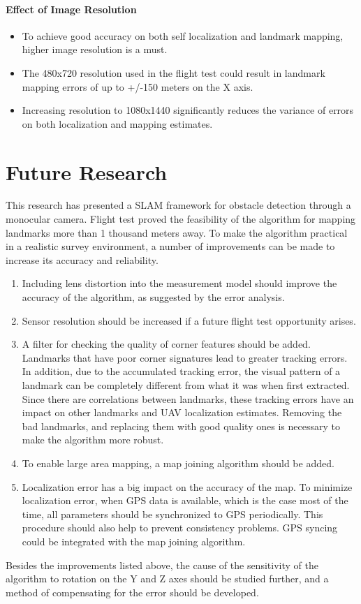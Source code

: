 \paragraph{Effect of Image Resolution}
\begin{itemize}
  \item To achieve good accuracy on both self localization and landmark
  mapping, higher image resolution is a must.
  \item The 480x720 resolution used in the flight test could result in
  landmark mapping errors of up to +/-150 meters on the X axis.
  \item Increasing resolution to 1080x1440 significantly reduces the
  variance of errors on both localization and mapping estimates.
\end{itemize}

\section{Future Research}
This research has presented a SLAM framework for obstacle detection
through a monocular camera. Flight test proved the feasibility of the
algorithm for mapping landmarks more than 1 thousand meters away.
To make the algorithm practical in a realistic survey environment, a number
of improvements can be made to increase its accuracy and reliability.
\begin{enumerate}
  \item Including lens distortion into the measurement model should
  improve the accuracy of the algorithm, as suggested by the error
  analysis.
  \item Sensor resolution should be increased if a future flight
  test opportunity arises.
  \item A filter for checking the quality of corner features should be
  added. Landmarks that have poor corner signatures lead to greater
  tracking errors. In addition, due to the accumulated tracking error,
  the visual pattern of a landmark can be completely different from
  what it was when first extracted. Since there are correlations between
  landmarks, these tracking errors have an impact on other landmarks and
  UAV localization estimates. Removing the bad landmarks, and
  replacing them with good quality ones is necessary to make the
  algorithm more robust.
  \item To enable large area mapping, a map joining algorithm should
  be added.
  \item Localization error has a big impact on the accuracy of the
  map. To minimize localization error, when GPS data is available,
  which is the case most of the time, all parameters should be
  synchronized to GPS periodically. This procedure should also help to
  prevent consistency problems. GPS syncing could be integrated with
  the map joining algorithm.
\end{enumerate}

Besides the improvements listed above, the cause of the sensitivity of
the algorithm to rotation on the Y and Z axes should be
studied further, and a method of compensating for the error should be
developed.

